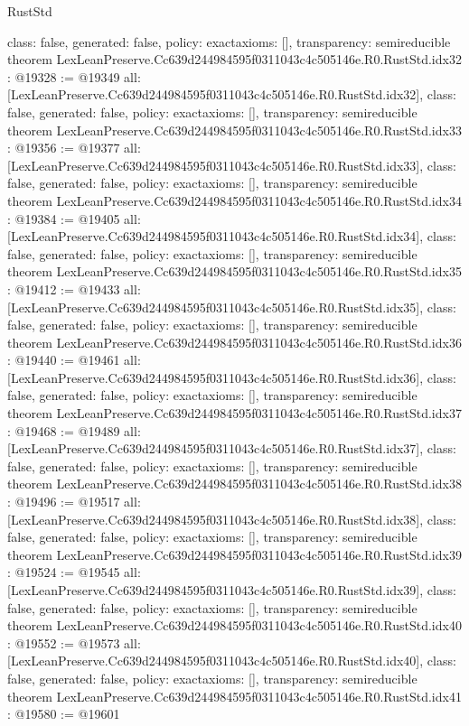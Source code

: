 \begin{lexlean}{RustStd}
\begin{coremodule}
{  class: false,
  generated: false,
  policy: exact{axioms: []},
  transparency: semireducible
}
theorem LexLeanPreserve.Cc639d244984595f0311043c4c505146e.R0.RustStd.idx32 : @19328 := @19349 {
  all: [LexLeanPreserve.Cc639d244984595f0311043c4c505146e.R0.RustStd.idx32],
  class: false,
  generated: false,
  policy: exact{axioms: []},
  transparency: semireducible
}
theorem LexLeanPreserve.Cc639d244984595f0311043c4c505146e.R0.RustStd.idx33 : @19356 := @19377 {
  all: [LexLeanPreserve.Cc639d244984595f0311043c4c505146e.R0.RustStd.idx33],
  class: false,
  generated: false,
  policy: exact{axioms: []},
  transparency: semireducible
}
theorem LexLeanPreserve.Cc639d244984595f0311043c4c505146e.R0.RustStd.idx34 : @19384 := @19405 {
  all: [LexLeanPreserve.Cc639d244984595f0311043c4c505146e.R0.RustStd.idx34],
  class: false,
  generated: false,
  policy: exact{axioms: []},
  transparency: semireducible
}
theorem LexLeanPreserve.Cc639d244984595f0311043c4c505146e.R0.RustStd.idx35 : @19412 := @19433 {
  all: [LexLeanPreserve.Cc639d244984595f0311043c4c505146e.R0.RustStd.idx35],
  class: false,
  generated: false,
  policy: exact{axioms: []},
  transparency: semireducible
}
theorem LexLeanPreserve.Cc639d244984595f0311043c4c505146e.R0.RustStd.idx36 : @19440 := @19461 {
  all: [LexLeanPreserve.Cc639d244984595f0311043c4c505146e.R0.RustStd.idx36],
  class: false,
  generated: false,
  policy: exact{axioms: []},
  transparency: semireducible
}
theorem LexLeanPreserve.Cc639d244984595f0311043c4c505146e.R0.RustStd.idx37 : @19468 := @19489 {
  all: [LexLeanPreserve.Cc639d244984595f0311043c4c505146e.R0.RustStd.idx37],
  class: false,
  generated: false,
  policy: exact{axioms: []},
  transparency: semireducible
}
theorem LexLeanPreserve.Cc639d244984595f0311043c4c505146e.R0.RustStd.idx38 : @19496 := @19517 {
  all: [LexLeanPreserve.Cc639d244984595f0311043c4c505146e.R0.RustStd.idx38],
  class: false,
  generated: false,
  policy: exact{axioms: []},
  transparency: semireducible
}
theorem LexLeanPreserve.Cc639d244984595f0311043c4c505146e.R0.RustStd.idx39 : @19524 := @19545 {
  all: [LexLeanPreserve.Cc639d244984595f0311043c4c505146e.R0.RustStd.idx39],
  class: false,
  generated: false,
  policy: exact{axioms: []},
  transparency: semireducible
}
theorem LexLeanPreserve.Cc639d244984595f0311043c4c505146e.R0.RustStd.idx40 : @19552 := @19573 {
  all: [LexLeanPreserve.Cc639d244984595f0311043c4c505146e.R0.RustStd.idx40],
  class: false,
  generated: false,
  policy: exact{axioms: []},
  transparency: semireducible
}
theorem LexLeanPreserve.Cc639d244984595f0311043c4c505146e.R0.RustStd.idx41 : @19580 := @19601 {
}
\end{coremodule}
\end{lexlean}
